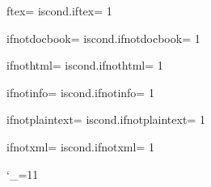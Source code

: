 {{

%
\def\makecond#1{%
  \expandafter\let\csname #1\endcsname = \relax
  \expandafter\let\csname iscond.#1\endcsname = 1
}
\makecond{iftex}
\makecond{ifnotdocbook}
\makecond{ifnothtml}
\makecond{ifnotinfo}
\makecond{ifnotplaintext}
\makecond{ifnotxml}

%
\def\direntry{\doignore{direntry}}
\def\documentdescription{\doignore{documentdescription}}
\def\docbook{\doignore{docbook}}
\def\html{\doignore{html}}
\def\ifdocbook{\doignore{ifdocbook}}
\def\ifhtml{\doignore{ifhtml}}
\def\ifinfo{\doignore{ifinfo}}
\def\ifnottex{\doignore{ifnottex}}
\def\ifplaintext{\doignore{ifplaintext}}
\def\ifxml{\doignore{ifxml}}
\def\ignore{\doignore{ignore}}
\def\menu{\doignore{menu}}
\def\xml{\doignore{xml}}

%
\newcount\doignorecount

\def\doignore#1{\begingroup
  \obeylines
  \catcode`\@ = \other
  \catcode`\{ = \other
  \catcode`\} = \other
  \spaceisspace
  \doignorecount = 0
  \dodoignore{#1}%
}

{ \catcode`_=11 %
  \obeylines %
  \gdef\dodoignore#1{%
    \long\def\doignoretext##1^^M@end #1{%
      \doignoretextyyy##1^^M@#1\_STOP_}%
    \long\def\doignoretextyyy##1^^M@#1##2\_STOP_{\doignoreyyy{##2}\_STOP_}%
    \doignoretext ^^M%
  }%
}

\def\doignoreyyy#1{%
  \def\temp{#1}%
  \ifx\temp\empty			%
    \let\next\doignoretextzzz
  \else					%
    \advance\doignorecount by 1
    \let\next\doignoretextyyy		%
  \fi
  \next #1%
}

}}

